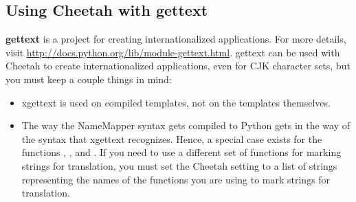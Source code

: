 \subsection{Using Cheetah with gettext}
\label{tips.gettext}

{\bf gettext} is a project for creating internationalized applications.  For 
more details, visit \url{http://docs.python.org/lib/module-gettext.html}.
gettext can be used with Cheetah to create internationalized applications, even
for CJK character sets, but you must keep a couple things in mind:
\begin{itemize}
\item xgettext is used on compiled templates, not on the templates themselves.
\item The way the NameMapper syntax gets compiled to Python gets in the way of 
the syntax that xgettext recognizes.  Hence, a special case exists for the
functions \code{_}, , and .  If you need to use a
different set of functions for marking strings for translation, you must set
the Cheetah setting  to a list of strings representing the
names of the functions you are using to mark strings for translation.
\end{itemize}


